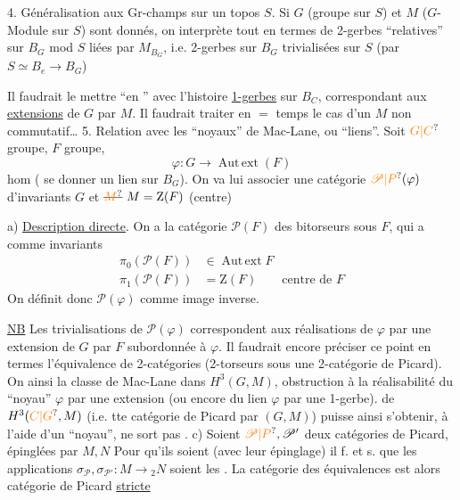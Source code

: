 4. Généralisation aux Gr-champs sur un topos $S$.  Si $G$ (groupe sur $S$) et $M$ ($G$-Module sur $S$) sont donnés, on interprète tout en termes de 2-gerbes ``relatives'' sur $B_G$ mod $S$ liées par $M_{B_G}$, i.e. 2-gerbes sur $B_G$ trivialisées sur $S$ (par $S\simeq B_e\longrightarrow B_G$)

Il faudrait le mettre ``en '' avec l'histoire  \uline{1-gerbes}  sur $B_C$, correspondant aux \uline{extensions} de $G$ par $M$. Il faudrait traiter en $=$ temps le cas d'un $M$ non commutatif\ldots
5. Relation avec les ``noyaux'' de Mac-Lane, ou ``liens''. Soit $\unsure{G|C}$ groupe, $F$ groupe,
\[
\varphi\colon G\longrightarrow\operatorname{Aut\,ext}(F)
\]
hom ( se donner un lien sur $B_G$). On va lui associer une catégorie  $\unsure{\mathscr P|P}(\varphi)$ d'invariants $G$ et $\deleted{\unsure{M}}\ M=\mathrm Z(F)$ (centre)

a) \uline{Description directe}. On a la  catégorie $\mathscr P(F)$ des bitorseurs sous $F$, qui a comme invariants
\[
\begin{aligned}
\pi_0(\mathscr P(F))&\in\operatorname{Aut\,ext}F\\
\pi_1(\mathscr P(F))&=\mathrm Z(F)\qquad\text{centre de }F
\end{aligned}
\]
On définit donc $\mathscr P(\varphi)$ comme image inverse.


\uline{NB} Les trivialisations de $\mathscr P(\varphi)$ correspondent aux réalisations de $\varphi$ par une extension de $G$ par $F$ subordonnée à $\varphi$. Il faudrait encore préciser ce point en termes  l'équivalence de 2-catégories (2-torseurs sous une 2-catégorie de Picard). On  ainsi la classe de Mac-Lane dans $H^3(G,M)$, obstruction à la réalisabilité du ``noyau'' $\varphi$ par une extension (ou encore du lien $\varphi$ par une 1-gerbe).     de $H^3(\unsure{C|G},M)$ (i.e. tte catégorie de Picard  par $(G,M)$) puisse ainsi s'obtenir, à l'aide d'un ``noyau'', ne sort pas  .
c) Soient $\unsure{\mathscr P|P},\mathscr P'$ deux catégories de Picard, épinglées par $M,N$ Pour qu'ils soient  (avec leur épinglage) il f. et s. que les applications $\sigma_{\mathscr P},\sigma_{\mathscr P'}\colon M\longrightarrow {}_2N$ soient les . La catégorie des équivalences est alors  catégorie de Picard \uline{stricte}

